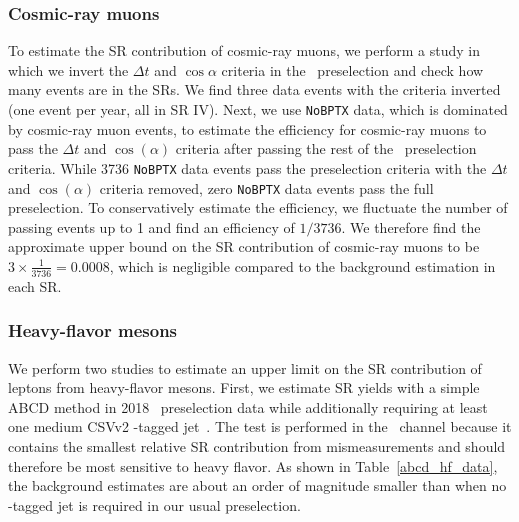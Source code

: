 

\subsubsection{Cosmic-ray muons}
To estimate the SR contribution of cosmic-ray muons, we perform a study in which we invert the $\Delta t$ and $\cos{\alpha}$ criteria in the \Pgm\Pgm\ preselection and check how many events are in the SRs. We find three data events with the criteria inverted (one event per year, all in SR IV). Next, we use \texttt{NoBPTX} data, which is dominated by cosmic-ray muon events, to estimate the efficiency for cosmic-ray muons to pass the $\Delta t$ and $\cos{(\alpha)}$ criteria after passing the rest of the \Pgm\Pgm\ preselection criteria. While \num{3736} \texttt{NoBPTX} data events pass the preselection criteria with the $\Delta t$ and $\cos{(\alpha)}$ criteria removed, zero \texttt{NoBPTX} data events pass the full preselection. To conservatively estimate the efficiency, we fluctuate the number of passing events up to 1 and find an efficiency of $1/3736$. We therefore find the approximate upper bound on the SR contribution of cosmic-ray muons to be $3\times\frac{1}{3736}=0.0008$, which is negligible compared to the background estimation in each SR.

\subsubsection{Heavy-flavor mesons}
We perform two studies to estimate an upper limit on the SR contribution of leptons from heavy-flavor mesons. First, we estimate SR yields with a simple ABCD method in 2018 \Pgm\Pgm\ preselection data while additionally requiring at least one medium CSVv2 \PQb-tagged jet~\cite{bjet_identification}. The test is performed in the \Pgm\Pgm\ channel because it contains the smallest relative SR contribution from mismeasurements and should therefore be most sensitive to heavy flavor. As shown in Table~\ref{abcd_hf_data}, the background estimates are about an order of magnitude smaller than when no \PQb-tagged jet is required in our usual preselection.




